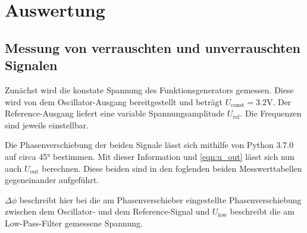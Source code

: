 \newpage
\section{Auswertung}
\subsection{Messung von verrauschten und unverrauschten Signalen}
\label{sec:Auswertung}

Zunächst wird die konstate Spannung des Funktionsgenerators gemessen. Diese wird von dem Oscillator-Ausgang bereitgestellt und beträgt $U_\text{const} = 3.2$V\!. Der Reference-Ausgang liefert eine variable Spannungsamplitude $U_\text{ref}$.
Die Frequenzen sind jeweils einstellbar.

Die Phasenverschiebung der beiden Signale lässt sich mithilfe von Python 3.7.0 auf circa 45° bestimmen. Mit dieser Information und \autoref{eqn:u_out} lässt sich nun auch $U_\text{out}$ berechnen.
Diese beiden sind in den foglenden beiden Messwerttabellen gegeneinander aufgeführt.



$\Delta\phi$ beschreibt hier bei die am Phasenverschieber eingestellte Phasenverschiebung zwischen dem Oscillator- und dem Reference-Signal und $U_\text{low}$ beschreibt die am
Low-Pass-Filter gemessene Spannung.

